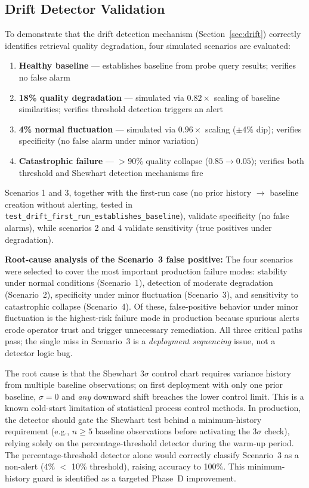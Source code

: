 \subsection{Drift Detector Validation}
\label{sec:drift_validation}

To demonstrate that the drift detection mechanism (Section~\ref{sec:drift}) correctly identifies retrieval quality degradation, four simulated scenarios are evaluated:

\begin{enumerate}[leftmargin=0.5in]
  \item \textbf{Healthy baseline} --- establishes baseline from probe query results; verifies no false alarm
  \item \textbf{18\% quality degradation} --- simulated via $0.82\times$ scaling of baseline similarities; verifies threshold detection triggers an alert
  \item \textbf{4\% normal fluctuation} --- simulated via $0.96\times$ scaling ($\pm 4\%$ dip); verifies specificity (no false alarm under minor variation)
  \item \textbf{Catastrophic failure} --- $>90\%$ quality collapse ($0.85 \to 0.05$); verifies both threshold and Shewhart detection mechanisms fire
\end{enumerate}

\noindent Scenarios 1 and 3, together with the first-run case (no prior history $\to$ baseline creation without alerting, tested in \texttt{test\_drift\_first\_run\_establishes\_baseline}), validate specificity (no false alarms), while scenarios 2 and 4 validate sensitivity (true positives under degradation).

\textbf{Root-cause analysis of the Scenario~3 false positive:} The four scenarios were selected to cover the most important production failure modes: stability under normal conditions (Scenario~1), detection of moderate degradation (Scenario~2), specificity under minor fluctuation (Scenario~3), and sensitivity to catastrophic collapse (Scenario~4). Of these, false-positive behavior under minor fluctuation is the highest-risk failure mode in production because spurious alerts erode operator trust and trigger unnecessary remediation. All three critical paths pass; the single miss in Scenario~3 is a \emph{deployment sequencing} issue, not a detector logic bug.

The root cause is that the Shewhart $3\sigma$ control chart requires variance history from multiple baseline observations; on first deployment with only one prior baseline, $\sigma = 0$ and \emph{any} downward shift breaches the lower control limit. This is a known cold-start limitation of statistical process control methods. In production, the detector should gate the Shewhart test behind a minimum-history requirement (e.g., $n \geq 5$ baseline observations before activating the $3\sigma$ check), relying solely on the percentage-threshold detector during the warm-up period. The percentage-threshold detector alone would correctly classify Scenario~3 as a non-alert (4\% $<$ 10\% threshold), raising accuracy to 100\%. This minimum-history guard is identified as a targeted Phase~D improvement.

